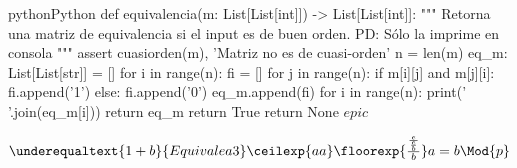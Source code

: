 
\begin{sourcecode}{python}{Python}
def equivalencia(m: List[List[int]]) -> List[List[int]]:
"""
Retorna una matriz de equivalencia si el input es de buen orden.
PD: Sólo la imprime en consola
"""
	assert cuasiorden(m), 'Matriz no es de cuasi-orden'
	n = len(m)
	eq_m: List[List[str]] = []
	for i in range(n):
		fi = []
		for j in range(n):
			if m[i][j] and m[j][i]:
				fi.append('1')
			else:
				fi.append('0')
			eq_m.append(fi)
			for i in range(n):
				print(' '.join(eq_m[i]))
	return eq_m
	return True
	return None $epic$
\end{sourcecode}

$\underequaltext{1+b}{Equivale a 3} \ceilexp{aa} \floorexp{\frac{\frac{e}{\frac{e}{b}}}{b}} a=b\Mod{p}$